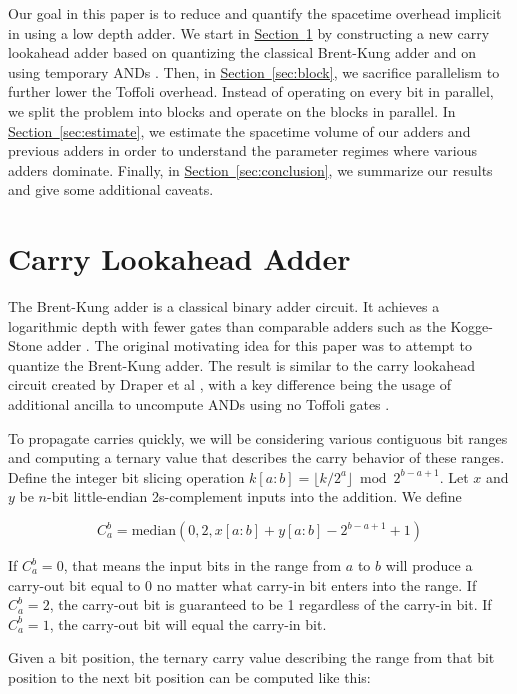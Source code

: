 \documentclass[onecolumn,unpublished]{quantumarticle}
\theoremstyle{definition}
\theoremstyle{definition}
\theoremstyle{definition}
\renewcommand{\sec}[1]{\hyperref[sec:#1]{Section~\ref*{sec:#1}}}
\begin{document}
Our goal in this paper is to reduce and quantify the spacetime overhead implicit in using a low depth adder.
We start in \sec{lookahead} by constructing a new carry lookahead adder based on quantizing the classical Brent-Kung adder \cite{brent1982adder} and on using temporary ANDs \cite{gidney2018halving}.
Then, in \sec{block}, we sacrifice parallelism to further lower the Toffoli overhead.
Instead of operating on every bit in parallel, we split the problem into blocks and operate on the blocks in parallel.
In \sec{estimate}, we estimate the spacetime volume of our adders and previous adders in order to understand the parameter regimes where various adders dominate.
Finally, in \sec{conclusion}, we summarize our results and give some additional caveats.


\section{Carry Lookahead Adder}
\label{sec:lookahead}

The Brent-Kung adder \cite{brent1982adder} is a classical binary adder circuit.
It achieves a logarithmic depth with fewer gates than comparable adders such as the Kogge-Stone adder \cite{kogge1973adder}.
The original motivating idea for this paper was to attempt to quantize the Brent-Kung adder.
The result is similar to the carry lookahead circuit created by Draper et al \cite{draper2004lookaheadadder}, with a key difference being the usage of additional ancilla to uncompute ANDs using no Toffoli gates \cite{gidney2018halving}.

To propagate carries quickly, we will be considering various contiguous bit ranges and computing a ternary value that describes the carry behavior of these ranges.
Define the integer bit slicing operation $k[a:b] = \lfloor k/2^a \rfloor \bmod 2^{b-a+1}$.
Let $x$ and $y$ be $n$-bit little-endian 2s-complement inputs into the addition.
We define

$$C_a^b = \text{median}(0, 2, x[a:b] + y[a:b] - 2^{b - a + 1} + 1)$$

If $C_a^b = 0$, that means the input bits in the range from $a$ to $b$ will produce a carry-out bit equal to 0 no matter what carry-in bit enters into the range.
If $C_a^b = 2$, the carry-out bit is guaranteed to be 1 regardless of the carry-in bit.
If $C_a^b = 1$, the carry-out bit will equal the carry-in bit.

Given a bit position, the ternary carry value describing the range from that bit position to the next bit position can be computed like this:
\end{document}
